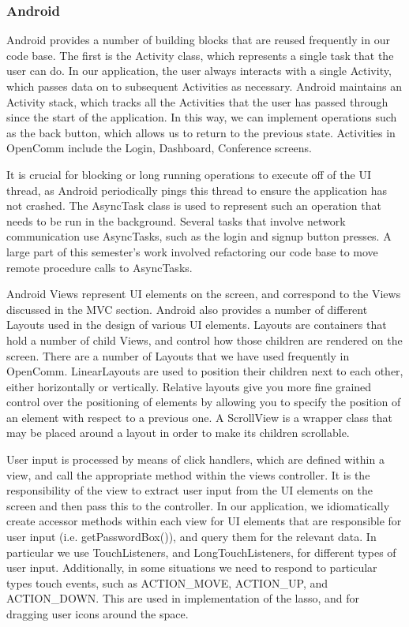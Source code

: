 \documentclass[12pt, letterpaper]{article}
\begin{document}
\subsubsection{Android}
Android provides a number of building blocks that are reused frequently in our code base. The first is the Activity class, which represents a single task that the user can do. In our application, the user always interacts with a single Activity, which passes data on to subsequent Activities as necessary. Android maintains an Activity stack, which tracks all the Activities that the user has passed through since the start of the application. In this way, we can implement operations such as the back button, which allows us to return to the previous state. Activities in OpenComm include the Login, Dashboard, Conference screens.

It is crucial for blocking or long running operations to execute off of the UI thread, as Android periodically pings this thread to ensure the application has not crashed. The AsyncTask class is used to represent such an operation that needs to be run in the background. Several tasks that involve network communication use AsyncTasks, such as the login and signup button presses. A large part of this semester’s work involved refactoring our code base to move remote procedure calls to AsyncTasks.

Android Views represent UI elements on the screen, and correspond to the Views discussed in the MVC section. Android also provides a number of different Layouts used in the design of various UI elements. Layouts are containers that hold a number of child Views, and control how those children are rendered on the screen. There are a number of Layouts that we have used frequently in OpenComm. LinearLayouts are used to position their children next to each other, either horizontally or vertically. Relative layouts give you more fine grained control over the positioning of elements by allowing you to specify the position of an element with respect to a previous one. A ScrollView is a wrapper class that may be placed around a layout in order to make its children scrollable.

User input is processed by means of click handlers, which are defined within a view, and call the appropriate method within the views controller. It is the responsibility of the view to extract user input from the UI elements on the screen and then pass this to the controller. In our application, we idiomatically create accessor methods within each view for UI elements that are responsible for user input (i.e. getPasswordBox()), and query them for the relevant data. In particular we use TouchListeners, and LongTouchListeners, for different types of user input. Additionally, in some situations we need to respond to particular types touch events, such as ACTION\_MOVE, ACTION\_UP, and ACTION\_DOWN. This are used in implementation of the lasso, and for dragging user icons around the space.
\end{document}
